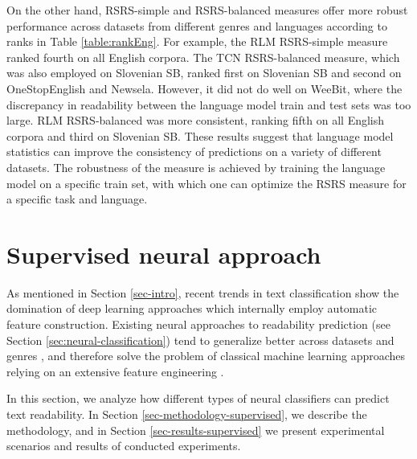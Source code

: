 \documentclass{clv3}
\begin{document}
On the other hand, RSRS-simple and RSRS-balanced measures offer more robust performance across datasets from different genres and languages according to ranks in Table \ref{table:rankEng}. For example, the RLM RSRS-simple measure ranked fourth on all English corpora. The TCN RSRS-balanced measure, which was also employed on Slovenian SB, ranked first on Slovenian SB and second on OneStopEnglish and Newsela. However, it did not do well on WeeBit, where the discrepancy in readability between the language model train and test sets was too large. RLM RSRS-balanced was more consistent, ranking fifth on all English corpora and third on Slovenian SB. These results suggest that language model statistics can improve the consistency of predictions on a variety of different datasets. The robustness of the measure is achieved by training the language model on a specific train set, with which one can optimize the RSRS measure for a specific task and language. 



\section{Supervised neural approach}
\label{sec:supervised}

As mentioned in Section \ref{sec-intro}, recent trends in text classification show the domination of deep learning approaches which internally employ automatic feature construction. Existing neural approaches to readability prediction (see Section \ref{sec:neural-classification}) tend to generalize better across datasets and genres \cite{filighera2019automatic}, and therefore solve the problem of classical machine learning approaches relying on an extensive feature engineering \citep{xia2016text}. 

In this section, we analyze how different types of neural classifiers can predict text readability. In Section \ref{sec-methodology-supervised}, we describe the methodology, and in Section \ref{sec-results-supervised} we present experimental scenarios and results of conducted experiments.
\end{document}

